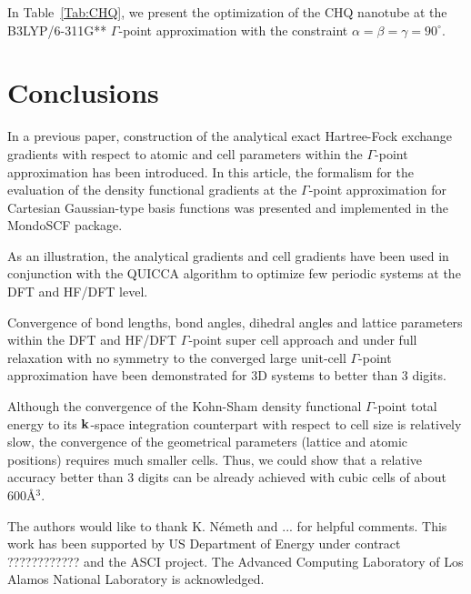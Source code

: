 \documentclass[prl,twocolumn,showpacs,twocolumngrid,superbib]{revtex4}
\begin{document}
In Table~\ref{Tab:CHQ}, we present the optimization of the CHQ nanotube
at the B3LYP/6-311G** $\Gamma$-point approximation with the constraint $\alpha=\beta=\gamma=90^\circ$. 

\section{Conclusions}\label{Sec:Conclusions}
In a previous paper, construction of the analytical 
exact Hartree-Fock exchange gradients with respect to 
atomic and cell parameters within the $\Gamma$-point 
approximation has been introduced. 
In this article, the formalism for the evaluation of the density 
functional gradients at the $\Gamma$-point approximation for 
Cartesian Gaussian-type basis functions was presented and 
implemented in the {\sc MondoSCF} package.

As an illustration, the analytical gradients and cell gradients have been used
in conjunction with the QUICCA algorithm to optimize few periodic systems at
the DFT and HF/DFT level.

Convergence of bond lengths, bond angles,
dihedral angles and lattice parameters within the DFT and HF/DFT $\Gamma$-point
super cell approach and under full relaxation with no symmetry
to the converged large unit-cell $\Gamma$-point approximation have
been demonstrated for 3D systems to better than 3 digits.

Although the convergence of the Kohn-Sham density functional $\Gamma$-point total energy to
its ${\bf k}$-space integration counterpart with respect to cell size is relatively slow,
the convergence of the geometrical parameters (lattice and atomic positions)
requires much smaller cells. Thus, we could show that a relative accuracy better
than 3 digits can be already achieved with cubic cells of about $600$\AA$^3$.


\begin{acknowledgments}
 The authors would like to thank K. N\'emeth and ...
 for helpful comments.
 This work has been supported by US Department of Energy 
 under contract ???????????? and the ASCI project.  
 The Advanced Computing Laboratory of Los 
 Alamos National Laboratory is acknowledged.
\end{acknowledgments}  

\end{document}
